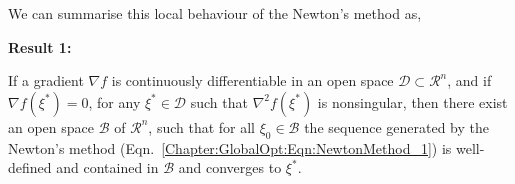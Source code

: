 We can summarise this local behaviour of the Newton's method as,
\begin{shaded}
\begin{center}
  {\bf Result 1:}
\end{center}
If a gradient $\nabla f$ is continuously differentiable in an open space $\mathcal{D}\subset\mathcal{R}^{n}$, and if $\nabla f\left(\xi^{\ast}\right)=0$, for any $\xi^{\ast}\in\mathcal{D}$ such that $\nabla^{2} f\left(\xi^{\ast}\right)$ is nonsingular, then there exist an open space $\mathcal{B}$ of $\mathcal{R}^{n}$, such that for all $\xi_{0}\in\mathcal{B}$ the sequence generated by the Newton's method (Eqn.~\ref{Chapter:GlobalOpt:Eqn:NewtonMethod_1}) is well-defined and contained in $\mathcal{B}$ and converges to $\xi^{\ast}$.
\end{shaded}

